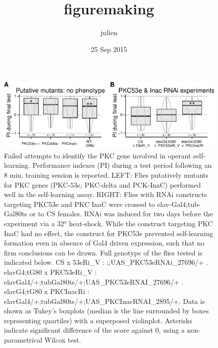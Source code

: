 \documentclass[]{article}
\title{figuremaking}
\author{julien}
\date{25 Sep 2015}
\begin{document}
\maketitle


\begin{figure}[htbp]
\centering
\includegraphics{firsttest_files/figure-latex/unnamed-chunk-2-1.pdf}
\caption{\label{fig:PKC} Failed attempts to identify the PKC gene
involved in operant self-learning. Performance indexes (PI) during a
test period following an 8 min. training session is reported. LEFT:
Flies putatively mutants for PKC genes (PKC-53e, PKC-delta and PCK-InaC)
performed well in the self-learning assay. RIGHT: Flies with RNAi
constructs targeting PKC53e and PKC InaC were crossed to
elav-Gal4;tub-Gal80ts or to CS females. RNAi was induced for two days
before the experiment via a 32° heat-shock. While the construct
targeting PKC InaC had no effect, the construct for PKC53e prevented
self-learning formation even in absence of Gal4 driven expression, such
that no firm conclusions can be drawn. Full genotype of the flies tested
is indicated below. CS x 53eRi\_V : ;;UAS\_PKC53eRNAi\_27696/+ .
elavG4;tG80 x PKC53eRi\_V :
elavGal4/+;tubGal80ts/+;UAS\_PKC53eRNAI\_27696/+ . elavG4;tG80 x
PKCInacRi : elavGal4/+;tubGal80ts/+;UAS\_PKCInacRNAI\_2895/+. Data is
shown as Tukey's boxplots (median is the line surrounded by boxes
representing quartiles) with a superposed violinplot. Asterisks indicate
significant difference of the score against 0, using a non-parametrical
Wilcox test.}
\end{figure}
\end{document}
